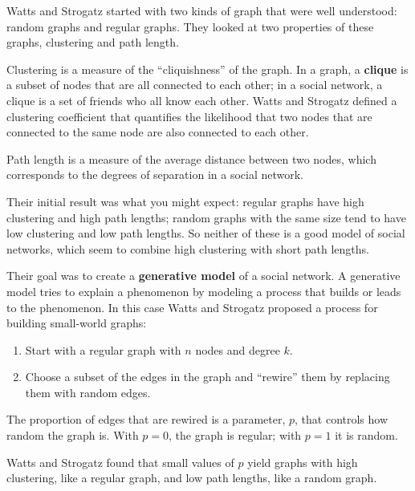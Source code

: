 \documentclass[10pt]{book}
\begin{document}
Watts and Strogatz started with two kinds of graph that were well
understood: random graphs and regular graphs.  They looked at two
properties of these graphs, clustering and path length.

\begin{description}

\item Clustering is a measure of the ``cliquishness'' of the graph.
In a graph, a {\bf clique} is a subset of nodes that are
all connected to each other; in a social network, a clique is
a set of friends who all know each other.  Watts and Strogatz
defined a clustering coefficient that quantifies the likelihood
that two nodes that are connected to the same node are also
connected to each other.

\item Path length is a measure of the average distance between
two nodes, which corresponds to the degrees of separation in
a social network.

\end{description}

Their initial result was what you might expect: regular graphs
have high clustering and high path lengths;
random graphs with the same size tend to have low clustering
and low path lengths.  So neither of these is a good model of
social networks, which seem to combine high clustering with
short path lengths.

Their goal was to create a {\bf generative model} of a social
network.  A generative model tries to explain a phenomenon by
modeling a process that builds or leads to the phenomenon.  In
this case Watts and Strogatz proposed a process for building
small-world graphs:

\begin{enumerate}

\item Start with a regular graph with $n$ nodes and degree $k$.

\item Choose a subset of the edges in the graph and ``rewire''
them by replacing them with random edges.

\end{enumerate}

The proportion of edges that are rewired is a parameter, $p$,
that controls how random the graph is.  With $p=0$, the graph
is regular; with $p=1$ it is random.

Watts and Strogatz found that small values of $p$ yield graphs
with high clustering, like a regular graph, and low path
lengths, like a random graph.
\end{document}
